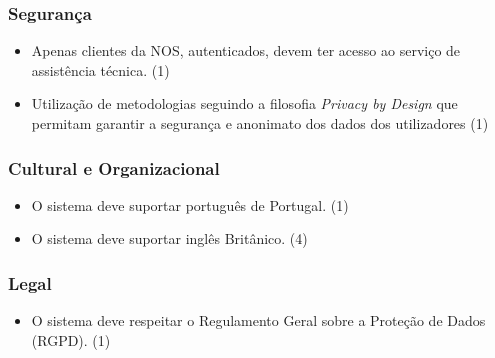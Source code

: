 \documentclass[11pt,a4paper]{article}
\newcommand{\requirement}[3]{
    #1 (#3)
}
\begin{document}
\begin{appendices}
\subsubsection{Segurança}
\begin{itemize}
    \setlength\itemsep{0em}
    \item \requirement
    {Apenas clientes da NOS, autenticados, devem ter acesso ao serviço de assistência técnica.}
    {A assistência técnica é direcionada apenas aos clientes da nós e por forma a resolver determinados problemas 
    é necessário saber os pormenores da subscrição do cliente. De tal forma é preciso que o cliente da NOS esteja
    autenticado por forma ao sistema saber de que utilizador se trata e de que pacotes esse utilizador tem subscrição.}
    {1}
    \item \requirement
    {Utilização de metodologias seguindo a filosofia \textit{Privacy by Design} que permitam garantir a segurança e 
    anonimato dos dados dos utilizadores}
    {O anonimato e segurança dos dados dos utilizadores é de suma importância no estabelecimento da confiança dos mesmos
    no sistema desenvolvido, sendo ainda requerido por lei pelo RGPD.}
    {1}
\end{itemize}

\subsubsection{Cultural e Organizacional}

\begin{itemize}
    \setlength\itemsep{0em}
    \item \requirement
    {O sistema deve suportar português de Portugal.}
    {O sistema é direccionado para os clientes da NOS e de outros fornecedores de serviços sendo a maioria destes 
    naturais de Portugal.}
    {1}
    \item \requirement
    {O sistema deve suportar inglês Britânico.}
    {De modo a atingir uma maior percentagem de possíveis utilizadores o sistema deve suportar inglês, a principal 
    língua do discurso internacional.}
    {4}
\end{itemize}

\subsubsection{Legal}
\begin{itemize}
    \setlength\itemsep{0em}
    \item \requirement
    {O sistema deve respeitar o Regulamento Geral sobre a Proteção de Dados (RGPD).}
    {Por envolver o tratamento de dados pessoais \textbf{i.e.} que permitam identificar univocamente
    o indivíduo ao qual dizem respeito, é obrigatório que o sistema desenvolvido respeito o RGPD. 
    Mais informações sobre o RGPD podem ser consultadas em \url{https://mydataprivacy.eu/o-regulamento/}
    e o RGPD pode ser consultado em 
    \url{https://mydataprivacy.eu/wp-content/uploads/2017/07/Regulamento-Geral-Prote\%C3\%A7\%C3\%A3o-Dados.pdf}.}
    {1}
\end{itemize}


\end{appendices}
\end{document}
